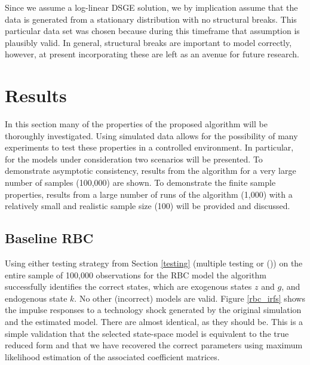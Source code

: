 \documentclass{article}
\begin{document}
Since we assume a log-linear DSGE solution, we by implication assume that the data is generated from a stationary distribution with no structural breaks. This particular data set was chosen because during this timeframe that assumption is plausibly valid. In general, structural breaks are important to model correctly, however, at present incorporating these are left as an avenue for future research.

\vspace{-0.01cm}

\section{Results} \label{results}

In this section many of the properties of the proposed algorithm will be thoroughly investigated. Using simulated data allows for the possibility of many experiments to test these properties in a controlled environment. In particular, for the models under consideration two scenarios will be presented. To demonstrate asymptotic consistency, results from the algorithm for a very large number of samples (100,000) are shown. To demonstrate the finite sample properties, results from a large number of runs of the algorithm (1,000) with a relatively small and realistic sample size (100) will be provided and discussed.

\subsection{Baseline RBC}

Using either testing strategy from Section \ref{testing} (multiple testing or \citeauthor{srivastava2005some} (\citeyear{srivastava2005some})) on the entire sample of 100,000 observations for the RBC model the algorithm successfully identifies the correct states, which are exogenous states $z$ and $g$, and endogenous state $k$. No other (incorrect) models are valid. Figure \ref{rbc_irfs} shows the impulse responses to a technology shock generated by the original simulation and the estimated model. There are almost identical, as they should be. This is a simple validation that the selected state-space model is equivalent to the true reduced form and that we have recovered the correct parameters using maximum likelihood estimation of the associated coefficient matrices.
\end{document}

